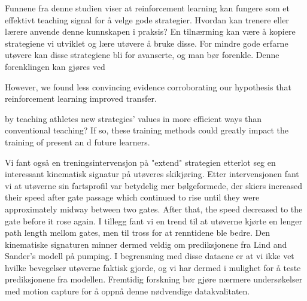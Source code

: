 Funnene fra denne studien viser at reinforcement learning kan fungere som et effektivt teaching signal for å velge gode strategier. Hvordan kan trenere eller lærere anvende denne kunnskapen i praksis? En tilnærming kan være å kopiere strategiene vi utviklet og lære utøvere å bruke disse. For mindre gode erfarne utøvere kan disse strategiene bli for avanserte, og man bør forenkle. Denne forenklingen kan gjøres ved 





However, we found less convincing evidence corroborating our hypothesis that reinforcement learning improved transfer.
 



by teaching athletes new strategies' values in more efficient ways than conventional teaching? If so, these training methods could greatly impact the training of present an d future learners.










Vi fant også en treningsintervensjon på "extend" strategien etterlot seg en interessant kinematisk signatur på utøveres skikjøring. Etter intervensjonen fant vi at utøverne sin fartsprofil var betydelig mer bølgeformede, der skiers increased their speed after gate passage which continued to rise until they were approximately midway between two gates. After that, the speed decreased to the gate before it rose again. I tillegg fant vi en trend til at utøverne kjørte en lenger path length mellom gates, men til tross for at renntidene ble bedre. Den kinematiske signaturen minner dermed veldig om prediksjonene fra Lind and Sander's modell på pumping. I begrensning med disse dataene er at vi ikke vet hvilke bevegelser utøverne faktisk gjorde, og vi har dermed i mulighet for å teste prediksjonene fra modellen. Fremtidig forskning bør gjøre nærmere undersøkelser med motion capture for å oppnå denne nødvendige datakvalitaten.















